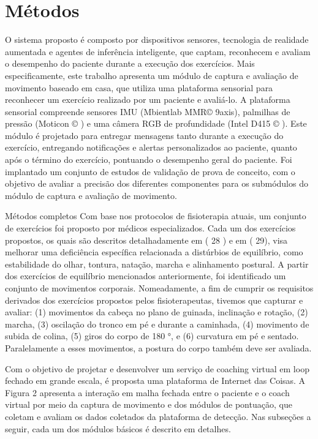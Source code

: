 \documentclass[10pt,a4paper,compsoc]{IEEEtran}
\begin{document}
\section{Métodos}


O sistema proposto é composto por dispositivos sensores, tecnologia de realidade aumentada e agentes de inferência inteligente, que captam, reconhecem e avaliam o desempenho do paciente durante a execução dos exercícios. Mais especificamente, este trabalho apresenta um módulo de captura e avaliação de movimento baseado em casa, que utiliza uma plataforma sensorial para reconhecer um exercício realizado por um paciente e avaliá-lo. A plataforma sensorial compreende sensores IMU (Mbientlab MMR© 9axis), palmilhas de pressão (Moticon © ) e uma câmera RGB de profundidade (Intel D415 © ). Este módulo é projetado para entregar mensagens tanto durante a execução do exercício, entregando notificações e alertas personalizados ao paciente, quanto após o término do exercício, pontuando o desempenho geral do paciente. Foi implantado um conjunto de estudos de validação de prova de conceito, com o objetivo de avaliar a precisão dos diferentes componentes para os submódulos do módulo de captura e avaliação de movimento.

Métodos completos
Com base nos protocolos de fisioterapia atuais, um conjunto de exercícios foi proposto por médicos especializados. Cada um dos exercícios propostos, os quais são descritos detalhadamente em ( 28 ) e em ( 29), visa melhorar uma deficiência específica relacionada a distúrbios de equilíbrio, como estabilidade do olhar, tontura, natação, marcha e alinhamento postural. A partir dos exercícios de equilíbrio mencionados anteriormente, foi identificado um conjunto de movimentos corporais. Nomeadamente, a fim de cumprir os requisitos derivados dos exercícios propostos pelos fisioterapeutas, tivemos que capturar e avaliar: (1) movimentos da cabeça no plano de guinada, inclinação e rotação, (2) marcha, (3) oscilação do tronco em pé e durante a caminhada, (4) movimento de subida de colina, (5) giros do corpo de 180 °, e (6) curvatura em pé e sentado. Paralelamente a esses movimentos, a postura do corpo também deve ser avaliada.

Com o objetivo de projetar e desenvolver um serviço de coaching virtual em loop fechado em grande escala, é proposta uma plataforma de Internet das Coisas. A Figura 2 apresenta a interação em malha fechada entre o paciente e o coach virtual por meio da captura de movimento e dos módulos de pontuação, que coletam e avaliam os dados coletados da plataforma de detecção. Nas subseções a seguir, cada um dos módulos básicos é descrito em detalhes.
\end{document}

